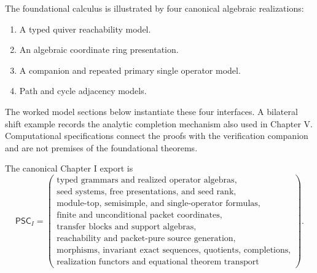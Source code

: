 \begin{definition}
\label{def:reserved-example-slots}
The foundational calculus is illustrated by four canonical algebraic realizations:
\begin{enumerate}[label=(\roman*)]
\item A typed quiver reachability model.
\item An algebraic coordinate ring presentation.
\item A companion and repeated primary single operator model.
\item Path and cycle adjacency models.
\end{enumerate}
The worked model sections below instantiate these four interfaces. A bilateral shift example records the analytic completion mechanism also used in Chapter V. Computational specifications connect the proofs with the verification companion and are not premises of the foundational theorems.
\end{definition}

\begin{definition}
\label{def:paper-one-export}
The canonical Chapter I export is
\[
\boxed{
\mathsf{PSC}_I=
\left(
\begin{array}{c}
\text{typed grammars and realized operator algebras},\\
\text{seed systems, free presentations, and seed rank},\\
\text{module-top, semisimple, and single-operator formulas},\\
\text{finite and unconditional packet coordinates},\\
\text{transfer blocks and support algebras},\\
\text{reachability and packet-pure source generation},\\
\text{morphisms, invariant exact sequences, quotients, completions},\\
\text{realization functors and equational theorem transport}
\end{array}
\right).
}
\]
\end{definition}



